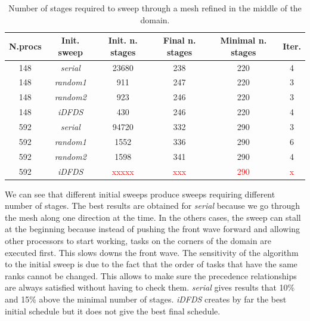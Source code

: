 \documentclass[letterpaper]{article}
\newcommand\red{\textcolor{red}}
\renewcommand{\(}{\left(}
\renewcommand{\)}{\right)}
\renewcommand{\[}{\left[}
\renewcommand{\]}{\right]}
\begin{document}
\begin{table}[H]
  \begin{center}
    \begin{tabular}{|c|c|c|c|c|c|}
      \hline
      N.procs & Init. sweep & Init. n. stages & Final n. stages & Minimal n. stages & Iter. \\
      \hline
      148 &  \emph{serial} & 23680 & 238 & 220 & 4 \\
      148 & \emph{random1} &   911 & 247 & 220 & 3 \\
      148 & \emph{random2} &   923 & 246 & 220 & 3 \\
      148 &   \emph{iDFDS} &   430 & 246 & 220 & 4 \\
      592 &  \emph{serial} & 94720 & 332 & 290 & 3 \\
      592 & \emph{random1} &  1552 & 336 & 290 & 6 \\
      592 & \emph{random2} &  1598 & 341 & 290 & 4 \\
      592 &   \emph{iDFDS} & \red{xxxxx} & \red{xxx} & \red{290} & \red{x} \\
      \hline
    \end{tabular}
    \caption{Number of stages required to sweep through a mesh refined
    in the middle of the domain.}
    \label{amr_1}
  \end{center}
\end{table}
We can see that different initial sweeps produce sweeps requiring different
number of stages. The best results are obtained for \emph{serial} because we go
through the mesh along one direction at the time. In the others cases, the sweep
can stall at the beginning because instead of pushing the front wave forward and
allowing other processors to start working, tasks on the corners of the domain
are executed first. This slows downs the front wave. The sensitivity of the
algorithm to the initial sweep is due to the fact that the order of tasks that
have the same ranks cannot be changed. This allows to make sure the precedence
relationships are always satisfied without having to check them. \emph{serial}
gives results that 10\% and 15\% above the minimal number of stages.
\emph{iDFDS} creates by far the best initial schedule but it does not give the
best final schedule.
\end{document}
